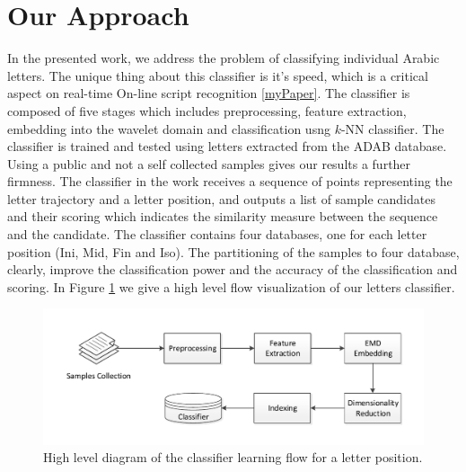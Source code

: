 \documentclass[10pt, conference, compsocconf]{IEEEtran}
\theoremstyle{definition}
\begin{document}
\section{Our Approach}
\label{sec:approach}
In the presented work, we address the problem of classifying individual Arabic letters.
The unique thing about this classifier is it's speed, which is a critical aspect on real-time On-line script recognition \ref{myPaper}.
The classifier is composed of five stages which includes preprocessing, feature extraction, embedding into the wavelet domain and classification usng $k$-NN classifier.
The classifier is trained and tested using letters extracted from the ADAB database. 
Using a public and not a self collected samples gives our results a further firmness.
The classifier in the work receives a sequence of points representing the letter trajectory and a letter position, and outputs a list of sample candidates and their scoring which indicates the similarity measure between the sequence and the candidate.
The classifier contains four databases, one for each letter position (Ini, Mid, Fin and Iso). 
The partitioning of the samples to four database, clearly, improve the classification power and the accuracy of the classification and scoring.
In Figure \ref{fig:letters_classifier_learning_flow} we give a high level flow visualization of our letters classifier.

\begin{figure}
\centering
\includegraphics[width=1\columnwidth]{./figures/letters_classifier_learning_flow}       
\caption{High level diagram of the classifier learning flow for a letter position.}
\label{fig:letters_classifier_learning_flow}
\end{figure}
\end{document}
